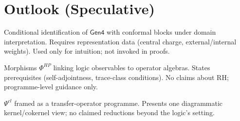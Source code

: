 \section*{Outlook (Speculative)}
\label{sec:outlook}
\begin{notation}
\label{not:agt-mapping}
Conditional identification of $\mathsf{Gen4}$ with conformal blocks under domain interpretation. Requires representation data (central charge, external/internal weights). Used only for intuition; not invoked in proofs.
\end{notation}
\begin{notation}
\label{not:hilbert-polya-programme}
Morphisms $\Phi^{HP}$ linking logic observables to operator algebras. States prerequisites (self-adjointness, trace-class conditions). No claims about RH; programme-level guidance only.
\end{notation}
\begin{notation}
\label{not:p-vs-np-spectral}
$\Psi^{cl}$ framed as a transfer-operator programme. Presents one diagrammatic kernel/cokernel view; no claimed reductions beyond the logic's setting.
\end{notation}
